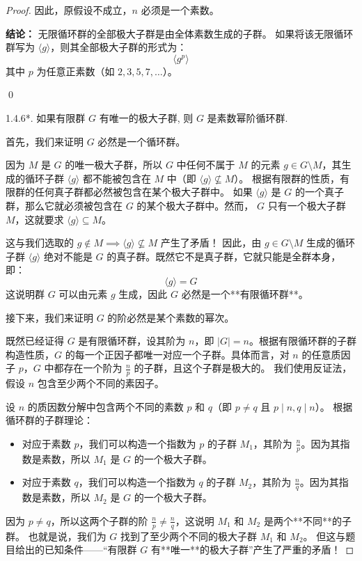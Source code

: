 \documentclass[]{article}
\begin{document}
\begin{proof}
因此，原假设不成立，$n$ 必须是一个素数。

\bigskip
\noindent \textbf{结论：} 
无限循环群的全部极大子群是由全体素数生成的子群。
如果将该无限循环群写为 $\langle g \rangle$，则其全部极大子群的形式为：
\[ \langle g^p \rangle \]
其中 $p$ 为任意正素数（如 $2, 3, 5, 7, \dots$）。

\qed

1.4.6*. 如果有限群 $G$ 有唯一的极大子群, 则 $G$ 是素数幂阶循环群. 

\bigskip
首先，我们来证明 $G$ 必然是一个循环群。

因为 $M$ 是 $G$ 的唯一极大子群，所以 $G$ 中任何不属于 $M$ 的元素 $g \in G \setminus M$，其生成的循环子群 $\langle g \rangle$ 都不能被包含在 $M$ 中（即 $\langle g \rangle \not\subseteq M$）。
根据有限群的性质，有限群的任何真子群都必然被包含在某个极大子群中。
如果 $\langle g \rangle$ 是 $G$ 的一个真子群，那么它就必须被包含在 $G$ 的某个极大子群中。然而， $G$ 只有一个极大子群 $M$，这就要求 $\langle g \rangle \subseteq M$。

这与我们选取的 $g \notin M \implies \langle g \rangle \not\subseteq M$ 产生了矛盾！
因此，由 $g \in G \setminus M$ 生成的循环子群 $\langle g \rangle$ 绝对不能是 $G$ 的真子群。既然它不是真子群，它就只能是全群本身，即：
\[ \langle g \rangle = G \]
这说明群 $G$ 可以由元素 $g$ 生成，因此 $G$ 必然是一个**有限循环群**。

\bigskip
接下来，我们来证明 $G$ 的阶必然是某个素数的幂次。

既然已经证得 $G$ 是有限循环群，设其阶为 $n$，即 $|G| = n$。根据有限循环群的子群构造性质，$G$ 的每一个正因子都唯一对应一个子群。具体而言，对 $n$ 的任意质因子 $p$，$G$ 中都存在一个阶为 $\frac{n}{p}$ 的子群，且这个子群是极大的。
我们使用反证法，假设 $n$ 包含至少两个不同的素因子。

设 $n$ 的质因数分解中包含两个不同的素数 $p$ 和 $q$（即 $p \neq q$ 且 $p \mid n, q \mid n$）。
根据循环群的子群理论：
\begin{itemize}
	\item 对应于素数 $p$，我们可以构造一个指数为 $p$ 的子群 $M_1$，其阶为 $\frac{n}{p}$。因为其指数是素数，所以 $M_1$ 是 $G$ 的一个极大子群。
	\item 对应于素数 $q$，我们可以构造一个指数为 $q$ 的子群 $M_2$，其阶为 $\frac{n}{q}$。因为其指数是素数，所以 $M_2$ 是 $G$ 的一个极大子群。
\end{itemize}

因为 $p \neq q$，所以这两个子群的阶 $\frac{n}{p} \neq \frac{n}{q}$，这说明 $M_1$ 和 $M_2$ 是两个**不同**的子群。
也就是说，我们为 $G$ 找到了至少两个不同的极大子群 $M_1$ 和 $M_2$。
但这与题目给出的已知条件——“有限群 $G$ 有**唯一**的极大子群”产生了严重的矛盾！


\end{proof}
\end{document}
